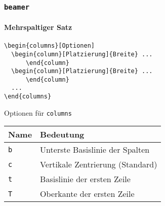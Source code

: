 \begin{frame}[fragile]
  \frametitle{\texttt{beamer}}
  \framesubtitle{Mehrspaltiger Satz}
\begin{lstlisting}[language={[LaTeX]TeX}]
\begin{columns}[Optionen]
  \begin{column}[Platzierung]{Breite} ...
      \end{column}
  \begin{column}[Platzierung]{Breite} ...
      \end{column}
  ...
\end{columns}
\end{lstlisting}
  Optionen für \texttt{columns}
  
  \begin{tabular}{ll}
    \textbf{Name} & \textbf{Bedeutung} \\\hline
    \texttt{b} & Unterste Basislinie der Spalten\\
    \texttt{c} & Vertikale Zentrierung (Standard)\\
    \texttt{t} & Basislinie der ersten Zeile\\
    \texttt{T} & Oberkante der ersten Zeile
  \end{tabular}
\end{frame}
